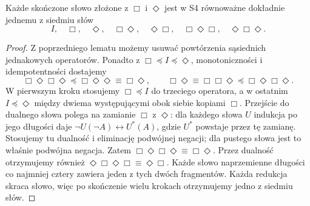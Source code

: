\begin{twierdzenie}
\label{thm:ncl-modal-S4-seven}
Każde skończone słowo złożone z $\Box$ i $\Diamond$
jest w S4 równoważne dokładnie jednemu z siedmiu słów
\[
 I,\quad\Box,\quad\Diamond,\quad
 \Box\Diamond,\quad\Diamond\Box,\quad
 \Box\Diamond\Box,\quad\Diamond\Box\Diamond.
\]
\end{twierdzenie}
\begin{proof}
Z poprzedniego lematu możemy usuwać powtórzenia
sąsiednich jednakowych operatorów.
Ponadto z $\Box\preceq I\preceq\Diamond$,
monotoniczności i idempotentności dostajemy
\[
 \Box\Diamond\Box\Diamond
 \preceq\Box\Diamond\Diamond
 \equiv\Box\Diamond,
 \qquad
 \Box\Diamond\equiv\Box\Box\Diamond
 \preceq\Box\Diamond\Box\Diamond.
\]
W pierwszym kroku stosujemy $\Box\preceq I$
do trzeciego operatora, a w ostatnim
$I\preceq\Diamond$ między dwiema występującymi
obok siebie kopiami $\Box$.
Przejście do dualnego słowa polega na zamianie
$\Box$ z $\Diamond$: dla każdego słowa $U$
indukcja po jego długości daje
$\neg U(\neg A)\leftrightarrow U^{*}(A)$,
gdzie $U^{*}$ powstaje przez tę zamianę.
Stosujemy tu dualność i eliminację podwójnej
negacji; dla pustego słowa jest to właśnie
podwójna negacja.
Zatem $\Box\Diamond\Box\Diamond\equiv\Box\Diamond$.
Przez dualność otrzymujemy również
$\Diamond\Box\Diamond\Box\equiv\Diamond\Box$.
Każde słowo naprzemienne długości co najmniej
cztery zawiera jeden z tych dwóch fragmentów.
Każda redukcja skraca słowo, więc po skończenie
wielu krokach otrzymujemy jedno z siedmiu słów.


\end{proof}
